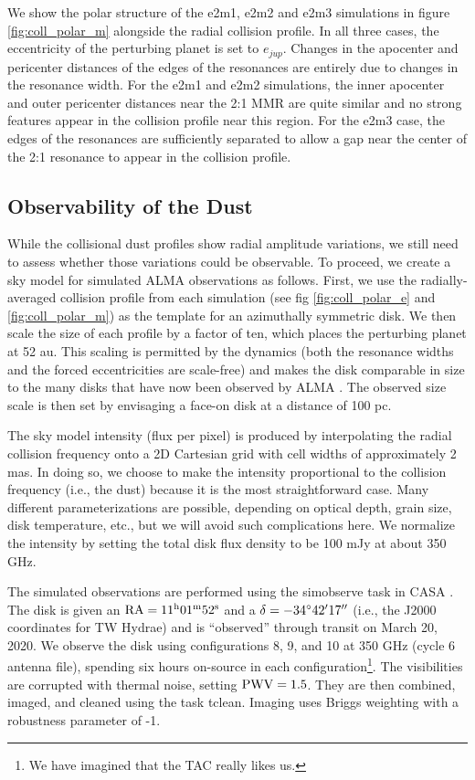 \documentclass[twocolumn]{aastex63}
\begin{document}
We show the polar structure of the e2m1, e2m2 and e2m3 simulations in figure \ref{fig:coll_polar_m} alongside the radial collision profile. In all three 
cases, the eccentricity of the perturbing planet is set to $e_{jup}$. Changes in the apocenter and pericenter distances of the edges of the 
resonances are entirely due to changes in the resonance width. For the e2m1 and e2m2 simulations, the inner apocenter and outer pericenter 
distances near the 2:1 MMR are quite similar and no strong features appear in the collision profile near this region. For the e2m3 case, the edges of 
the resonances are sufficiently separated to allow a gap near the center of the 2:1 resonance to appear in the collision profile.

\subsection{Observability of the Dust}

While the collisional dust profiles show radial amplitude variations, we still need to assess whether those variations could be observable. To proceed, 
we create a sky model for simulated ALMA observations as follows. First, we use the radially-averaged collision profile from each simulation (see fig 
\ref{fig:coll_polar_e} and \ref{fig:coll_polar_m}) as the template for an azimuthally symmetric disk. We then scale the size of each profile by a factor of 
ten, which places the perturbing planet at 52 au. This scaling is permitted by the dynamics (both the resonance widths and the forced eccentricities 
are scale-free) and makes the disk comparable in size to the many disks that have now been observed by ALMA \citep{2018ApJ...869L..42H}. The 
observed size scale is then set by envisaging a face-on disk at a distance of 100 pc.  

The sky model intensity (flux per pixel) is produced by interpolating the radial collision frequency onto a 2D Cartesian grid with cell widths of 
approximately 2 mas. In doing so, we choose to make the intensity proportional to the collision frequency (i.e., the dust) because it is the most 
straightforward case. Many different parameterizations are possible, depending on optical depth, grain size, disk temperature, etc., but we will avoid 
such complications here. We normalize the intensity by setting the total disk flux density to be 100 mJy at about 350 GHz.  

The simulated observations are performed using the {simobserve} task in {\sc CASA} \citep{2007ASPC..376..127M}.  The disk is given an 
$\rm RA = 11^{\rm h} 01^{\rm m} 52^{\rm s}$ and a $\delta = -34^\circ 42\mbox{$^\prime$} 17\mbox{$^{\prime\prime}$}$ (i.e., the J2000 coordinates for TW Hydrae) and is 
``observed'' through transit on March 20, 2020. We observe the disk using configurations 8, 9, and 10 at 350 GHz (cycle 6 antenna file), spending six 
hours on-source in each configuration\footnote{We have imagined that the TAC really likes us.}.  The visibilities are corrupted with thermal noise, 
setting $\rm PWV=1.5$. They are then combined, imaged, and cleaned using the task {tclean}. Imaging uses Briggs weighting with a robustness 
parameter of -1. 
\end{document}
